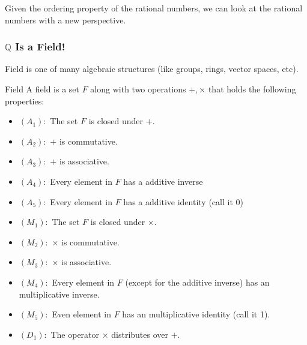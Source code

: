 Given the ordering property of the rational numbers, we can look at the rational numbers with a new perspective.


\subsubsection{$ \mathbb{Q} $ Is a Field!}
Field is one of many algebraic structures (like groups, rings, vector spaces, etc). 

\begin{defbox}{Field}
	A field is a set $ F $ along with two operations $ +, \times $ that holds the following properties:
	\begin{itemize}
		\item $ (A_1): $ The set $ F $ is closed under $ + $. 
		\item $ (A_2): $ $ + $ is commutative.
		\item $ (A_3): $ $ + $ is associative.
		\item $ (A_4): $ Every element in $ F $ has a additive inverse
		\item $ (A_5): $ Every element in $ F $ has a additive identity (call it 0)
		\item $ (M_1): $ The set $ F $ is closed under $ \times $.
		\item $ (M_2): $ $ \times $ is commutative.
		\item $ (M_3): $ $ \times $ is associative.
		\item $ (M_4): $ Every element in $ F $ (except for the additive inverse) has an multiplicative inverse.
		\item $ (M_5): $ Even element in $ F $ has an multiplicative identity (call it 1).
		\item $ (D_1): $ The operator $ \times $ distributes over $ + $.
	\end{itemize}
\end{defbox}

